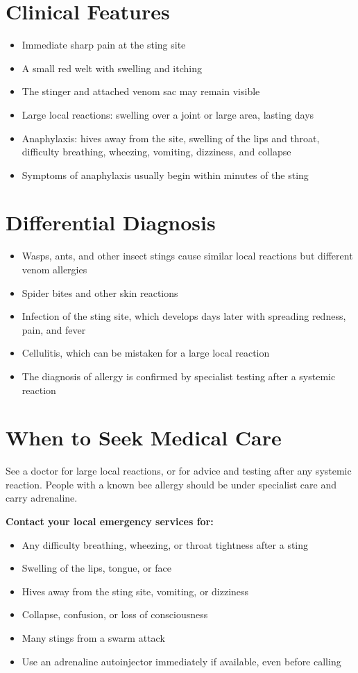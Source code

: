 \section*{Clinical Features}
\begin{itemize}
    \item Immediate sharp pain at the sting site
    \item A small red welt with swelling and itching
    \item The stinger and attached venom sac may remain visible
    \item Large local reactions: swelling over a joint or large area, lasting days
    \item Anaphylaxis: hives away from the site, swelling of the lips and throat, difficulty breathing, wheezing, vomiting, dizziness, and collapse
    \item Symptoms of anaphylaxis usually begin within minutes of the sting
\end{itemize}

\section*{Differential Diagnosis}
\begin{itemize}
    \item Wasps, ants, and other insect stings cause similar local reactions but different venom allergies
    \item Spider bites and other skin reactions
    \item Infection of the sting site, which develops days later with spreading redness, pain, and fever
    \item Cellulitis, which can be mistaken for a large local reaction
    \item The diagnosis of allergy is confirmed by specialist testing after a systemic reaction
\end{itemize}

\section*{When to Seek Medical Care}
See a doctor for large local reactions, or for advice and testing after any systemic reaction. People with a known bee allergy should be under specialist care and carry adrenaline.

\textbf{Contact your local emergency services for:}
\begin{itemize}
    \item Any difficulty breathing, wheezing, or throat tightness after a sting
    \item Swelling of the lips, tongue, or face
    \item Hives away from the sting site, vomiting, or dizziness
    \item Collapse, confusion, or loss of consciousness
    \item Many stings from a swarm attack
    \item Use an adrenaline autoinjector immediately if available, even before calling
\end{itemize}

